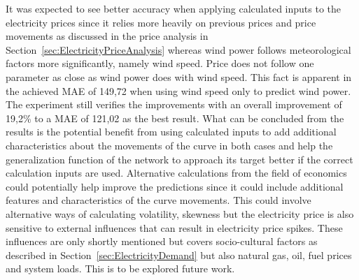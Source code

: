 It was expected to see better accuracy when applying calculated inputs to the electricity prices since it relies more heavily on previous prices and price movements as discussed in the price analysis in Section~\ref{sec:ElectricityPriceAnalysis} whereas wind power follows meteorological factors more significantly, namely wind speed. Price does not follow one parameter as close as wind power does with wind speed. This fact is apparent in the achieved MAE of 149,72 when using wind speed only to predict wind power. The experiment still verifies the improvements with an overall improvement of 19,2\% to a MAE of 121,02 as the best result. What can be concluded from the results is the potential benefit from using calculated inputs to add additional characteristics about the movements of the curve in both cases and help the generalization function of the network to approach its target better if the correct calculation inputs are used. Alternative calculations from the field of economics could potentially help improve the predictions since it could include additional features and characteristics of the curve movements. This could involve alternative ways of calculating volatility, skewness but the electricity price is also sensitive to external influences that can result in electricity price spikes\cite{singhal2011electricity}. These influences are only shortly mentioned but covers socio-cultural factors as described in Section~\ref{sec:ElectricityDemand} but also natural gas, oil, fuel prices and system loads\cite{singhal2011electricity}. This is to be explored future work. 

